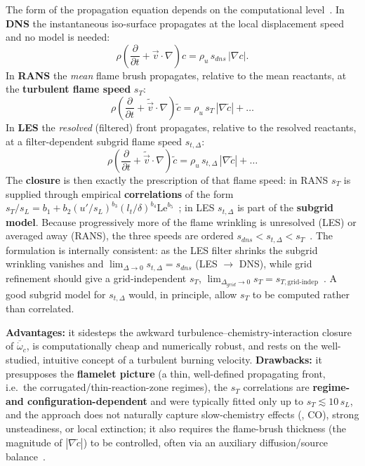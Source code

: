 {The form of the propagation equation depends on the computational level~\cite{lecture10}. In \textbf{DNS} the instantaneous iso-surface propagates at the local displacement speed and no model is needed:
\begin{equation*}
\rho\left(\frac{\partial}{\partial t} + \vec v\cdot\nabla\right)c = \rho_u\, s_{dns}\,|\nabla c|.
\end{equation*}
In \textbf{RANS} the \emph{mean} flame brush propagates, relative to the mean reactants, at the \textbf{turbulent flame speed} $s_T$:
\begin{equation*}
\rho\left(\frac{\partial}{\partial t} + \tilde{\vec v}\cdot\nabla\right)\tilde c = \rho_u\, s_T\,|\nabla \tilde c| + \dots
\end{equation*}
In \textbf{LES} the \emph{resolved} (filtered) front propagates, relative to the resolved reactants, at a filter-dependent subgrid flame speed $s_{t,\Delta}$:
\begin{equation*}
\rho\left(\frac{\partial}{\partial t} + \tilde{\vec v}\cdot\nabla\right)\tilde c = \rho_u\, s_{t,\Delta}\,|\nabla \tilde c| + \dots
\end{equation*}
The \textbf{closure} is then exactly the prescription of that flame speed: in RANS $s_T$ is supplied through empirical \textbf{correlations} of the form $s_T/s_L = b_1 + b_2(u'/s_L)^{b_3}(l_t/\delta)^{b_4}\mathrm{Le}^{b_5}$~\cite{ciccarelli2008flame,warnatz2006combustion}; in LES $s_{t,\Delta}$ is part of the \textbf{subgrid model}. Because progressively more of the flame wrinkling is unresolved (LES) or averaged away (RANS), the three speeds are ordered $s_{dns} < s_{t,\Delta} < s_T$~\cite{lecture10}. The formulation is internally consistent: as the LES filter shrinks the subgrid wrinkling vanishes and $\lim_{\Delta\to 0} s_{t,\Delta} = s_{dns}$ (LES $\to$ DNS), while grid refinement should give a grid-independent $s_T$, $\lim_{\Delta_{grid}\to 0} s_T = s_{T,\text{grid-indep}}$~\cite{lecture10}. A good subgrid model for $s_{t,\Delta}$ would, in principle, allow $s_T$ to be computed rather than correlated.

\textbf{Advantages:} it sidesteps the awkward turbulence--chemistry-interaction closure of $\overline{\dot\omega}_c$, is computationally cheap and numerically robust, and rests on the well-studied, intuitive concept of a turbulent burning velocity. \textbf{Drawbacks:} it presupposes the \textbf{flamelet picture} (a thin, well-defined propagating front, i.e.\ the corrugated/thin-reaction-zone regimes), the $s_T$ correlations are \textbf{regime- and configuration-dependent} and were typically fitted only up to $s_T \lesssim 10\,s_L$, and the approach does not naturally capture slow-chemistry effects (, CO), strong unsteadiness, or local extinction; it also requires the flame-brush thickness (the magnitude of $|\nabla\tilde c|$) to be controlled, often via an auxiliary diffusion/source balance~\cite{veynante2002turbulent,peters2000turbulent}.
}




